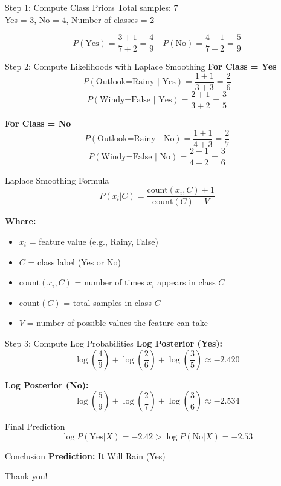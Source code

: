\documentclass{beamer}
\begin{document}
\begin{frame}{Step 1: Compute Class Priors}
Total samples: 7 \\
Yes = 3, No = 4, Number of classes = 2

\[
P(\text{Yes}) = \frac{3 + 1}{7 + 2} = \frac{4}{9} \quad 
P(\text{No}) = \frac{4 + 1}{7 + 2} = \frac{5}{9}
\]
\end{frame}

\begin{frame}{Step 2: Compute Likelihoods with Laplace Smoothing}
\textbf{For Class = Yes}
\[
P(\text{Outlook=Rainy | Yes}) = \frac{1 + 1}{3 + 3} = \frac{2}{6}
\]
\[
P(\text{Windy=False | Yes}) = \frac{2 + 1}{3 + 2} = \frac{3}{5}
\]

\textbf{For Class = No}
\[
P(\text{Outlook=Rainy | No}) = \frac{1 + 1}{4 + 3} = \frac{2}{7}
\]
\[
P(\text{Windy=False | No}) = \frac{2 + 1}{4 + 2} = \frac{3}{6}
\]
\end{frame}

\begin{frame}{Laplace Smoothing Formula}
\[
P(x_i | C) = \frac{\text{count}(x_i, C) + 1}{\text{count}(C) + V}
\]

\textbf{Where:}
\begin{itemize}
  \item $x_i$ = feature value (e.g., Rainy, False)
  \item $C$ = class label (Yes or No)
  \item $\text{count}(x_i, C)$ = number of times $x_i$ appears in class $C$
  \item $\text{count}(C)$ = total samples in class $C$
  \item $V$ = number of possible values the feature can take
\end{itemize}
\end{frame}

\begin{frame}{Step 3: Compute Log Probabilities}
\textbf{Log Posterior (Yes):}
\[
\log\left(\frac{4}{9}\right) + \log\left(\frac{2}{6}\right) + \log\left(\frac{3}{5}\right) \approx -2.420
\]

\textbf{Log Posterior (No):}
\[
\log\left(\frac{5}{9}\right) + \log\left(\frac{2}{7}\right) + \log\left(\frac{3}{6}\right) \approx -2.534
\]
\end{frame}

\begin{frame}{Final Prediction}
\[
\log P(\text{Yes} | X) = -2.42 > \log P(\text{No} | X) = -2.53
\]

\begin{block}{Conclusion}
\textbf{Prediction:} It Will Rain (Yes)
\end{block}
\end{frame}



\begin{frame}[standout]
    Thank you!
\end{frame}
\end{document}
